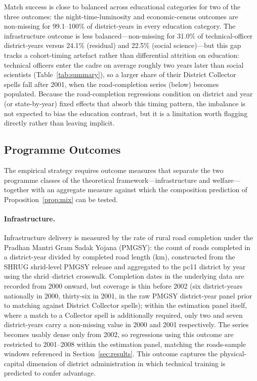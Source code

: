 Match success is close to balanced across educational categories for two of the
three outcomes: the night-time-luminosity and economic-census outcomes are
non-missing for 99.1--100\% of district-years in every education category. The
infrastructure outcome is less balanced---non-missing for 31.0\% of technical-officer
district-years versus 24.1\% (residual) and 22.5\% (social science)---but this gap
tracks a cohort-timing artefact rather than differential attrition on education:
technical officers enter the cadre on average roughly two years later than social
scientists (Table~\ref{tab:summary}), so a larger share of their District Collector
spells fall after 2001, when the road-completion series (below) becomes populated.
Because the road-completion regressions condition on district and year (or
state-by-year) fixed effects that absorb this timing pattern, the imbalance is not
expected to bias the education contrast, but it is a limitation worth flagging
directly rather than leaving implicit.

\subsection{Programme Outcomes}
\label{sec:data-outcomes}

The empirical strategy requires outcome measures that separate the two programme
classes of the theoretical framework---infrastructure and welfare---together with an
aggregate measure against which the composition prediction of
Proposition~\ref{prop:mix} can be tested.

\paragraph{Infrastructure.} Infrastructure delivery is measured by the rate of rural
road completion under the Pradhan Mantri Gram Sadak Yojana (PMGSY): the count of
roads completed in a district-year divided by completed road length (km),
constructed from the SHRUG shrid-level PMGSY release and aggregated to the
pc11 district by year using the shrid--district crosswalk. Completion dates in the
underlying data are recorded from 2000 onward, but coverage is thin before 2002 (six
district-years nationally in 2000, thirty-six in 2001, in the raw PMGSY district-year
panel prior to matching against District Collector spells); within the estimation
panel itself, where a match to a Collector spell is additionally required, only two
and seven district-years carry a non-missing value in 2000 and 2001 respectively. The
series becomes usably dense only from 2002, so regressions using this outcome are
restricted to 2001--2008 within the estimation panel, matching the roads-sample
windows referenced in Section~\ref{sec:results}. This outcome captures the
physical-capital dimension of
district administration in which technical training is predicted to confer
advantage.

